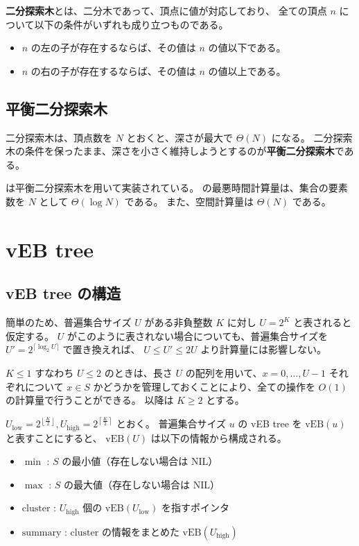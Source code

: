 \documentclass[dvipdfmx,a4j,10pt]{jarticle}
\begin{document}
\textbf{二分探索木}とは、二分木であって、頂点に値が対応しており、
全ての頂点 $n$ について以下の条件がいずれも成り立つものである。

\begin{itemize}
  \item $n$ の左の子が存在するならば、その値は $n$ の値以下である。
  \item $n$ の右の子が存在するならば、その値は $n$ の値以上である。
\end{itemize}

\subsection{平衡二分探索木}

二分探索木は、頂点数を $N$ とおくと、深さが最大で $\Theta(N)$ になる。
二分探索木の条件を保ったまま、深さを小さく維持しようとするのが\textbf{平衡二分探索木}である。

 は平衡二分探索木を用いて実装されている。
 の最悪時間計算量は、集合の要素数を $N$ として $\Theta(\log N)$ である。
また、空間計算量は $\Theta(N)$ である。

\section{vEB tree}

\subsection{vEB tree の構造}

簡単のため、普遍集合サイズ $U$ がある非負整数 $K$ に対し $U = 2^K$ と表されると仮定する。
$U$ がこのように表されない場合についても、普遍集合サイズを $U' = 2^{\lceil \log_2 U \rceil}$ で置き換えれば、
$U \leq U' \leq 2U$ より計算量には影響しない。

$K \leq 1$ すなわち $U \leq 2$ のときは、長さ $U$ の配列を用いて、$x = 0, \dots, U - 1$ それぞれについて $x \in S$ かどうかを管理しておくことにより、全ての操作を $O(1)$ の計算量で行うことができる。
以降は $K \geq 2$ とする。

$U_{\mathrm{low}} = 2^{\left\lfloor \frac{K}{2} \right\rfloor}, 
U_{\mathrm{high}} = 2^{\left\lceil \frac{K}{2} \right\rceil}$ とおく。
普遍集合サイズ $u$ の vEB tree を $\mathrm{vEB}(u)$ と表すことにすると、
$\mathrm{vEB}(U)$ は以下の情報から構成される。

\begin{itemize}
  \item $\min$ : $S$ の最小値（存在しない場合は $\mathrm{NIL}$）
  \item $\max$ : $S$ の最大値（存在しない場合は $\mathrm{NIL}$）
  \item $\mathrm{cluster}$ : $U_{\mathrm{high}}$ 個の $\mathrm{vEB}(U_{\mathrm{low}})$ を指すポインタ
  \item $\mathrm{summary}$ : $\mathrm{cluster}$ の情報をまとめた $\mathrm{vEB}(U_{\mathrm{high}})$
\end{itemize}
\end{document}
